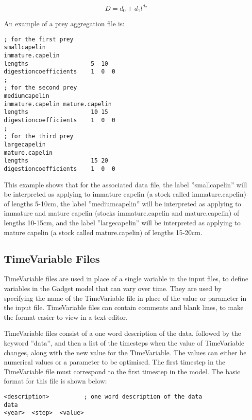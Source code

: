 \documentclass[10pt,twoside]{book}
\begin{document}
\begin{equation}\label{eq:digestion}
D = d_{0} + d_{1}l^{d_{2}}
\end{equation}

\bigskip
An example of a prey aggregation file is:

{\small\begin{verbatim}
; for the first prey
smallcapelin
immature.capelin
lengths                  5  10
digestioncoefficients    1  0  0
;
; for the second prey
mediumcapelin
immature.capelin mature.capelin
lengths                  10 15
digestioncoefficients    1  0  0
;
; for the third prey
largecapelin
mature.capelin
lengths                  15 20
digestioncoefficients    1  0  0
\end{verbatim}}

This example shows that for the associated data file, the label ''smallcapelin'' will be interpreted as applying to immature capelin (a stock called immature.capelin) of lengths 5-10cm, the label ''mediumcapelin'' will be interpreted as applying to immature and mature capelin (stocks immature.capelin and mature.capelin) of lengths 10-15cm, and the label ''largecapelin'' will be interpreted as applying to mature capelin (a stock called mature.capelin) of lengths 15-20cm.

\subsection{TimeVariable Files}
TimeVariable files are used in place of a single variable in the input files, to define variables in the Gadget model that can vary over time.  They are used by specifying the name of the TimeVariable file in place of the value or parameter in the input file.  TimeVariable files can contain comments and blank lines, to make the format easier to view in a text editor.

\bigskip
TimeVariable files consist of a one word description of the data, followed by the keyword ''data'', and then a list of the timesteps when the value of TimeVariable changes, along with the new value for the TimeVariable.  The values can either be numerical values or a parameter to be optimised.  The first timestep in the TimeVariable file must correspond to the first timestep in the model.  The basic format for this file is shown below:

{\small\begin{verbatim}
<description>          ; one word description of the data
data
<year>  <step>  <value>
\end{verbatim}}
\end{document}
